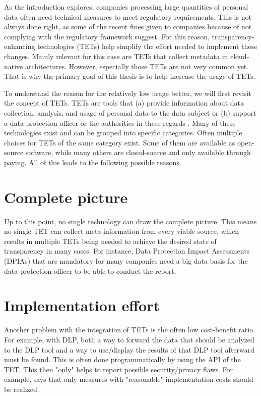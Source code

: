 


\graphicspath{{2/figures/}}

As the introduction explores, companies processing large quantities of personal data often need technical measures to meet regulatory requirements. This is not always done right, as some of the recent fines given to companies because of not complying with the regulatory framework suggest. For this reason, transparency-enhancing technologies (TETs) help simplify the effort needed to implement these changes. Mainly relevant for this case are TETs that collect metadata in cloud-native architectures.
However, especially those TETs are not very common yet. That is why the primary goal of this thesis is to help increase the usage of TETs.

To understand the reason for the relatively low usage better, we will first revisit the concept of TETs.
TETs are tools that (a) provide information about data collection, analysis, and usage of personal data to the data subject or (b) support a data-protection officer or the authorities in these regards \cite{zimmermann_categorization_2015}. Many of these technologies exist and can be grouped into specific categories. Often multiple choices for TETs of the same category exist. Some of them are available as open-source software, while many others are closed-source and only available through paying. All of this leads to the following possible reasons.

\section{Complete picture}
Up to this point, no single technology can draw the complete picture. This means no single TET can collect meta-information from every viable source, which results in multiple TETs being needed to achieve the desired state of transparency in many cases. For instance, Data Protection Impact Assessments (DPIAs) that are mandatory for many companies need a big data basis for the data protection officer to be able to conduct the report.

\section{Implementation effort} 
Another problem with the integration of TETs is the often low cost-benefit ratio. 
For example, with DLP, both a way to forward the data that should be analyzed to the DLP tool and a way to use/display the results of that DLP tool afterward must be found. This is often done programmatically by using the API of the TET.
This then "only" helps to report possible security/privacy flaws. For example, \parencite[Art. 25]{noauthor_general_2016} says that only measures with "reasonable" implementation costs should be realized.

